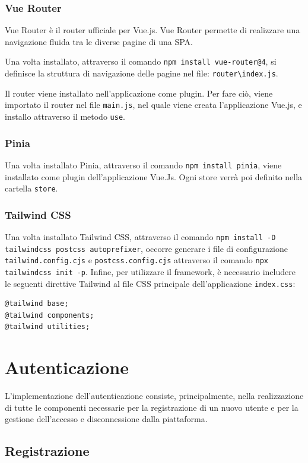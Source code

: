 \subsubsection{Vue Router}
Vue Router \`e il router ufficiale per Vue.js. Vue Router permette di realizzare una navigazione fluida tra le diverse pagine di una SPA.

Una volta installato, attraverso il comando \verb|npm install vue-router@4|, si definisce la struttura di navigazione delle pagine nel file: \verb|router\index.js|.

Il router viene installato nell'applicazione come plugin. Per fare ci\`o, viene importato il router nel file \verb|main.js|, nel quale viene creata l'applicazione Vue.js, e installo attraverso il metodo \verb|use|.
\subsubsection{Pinia}
Una volta installato Pinia, attraverso il comando \verb|npm install pinia|, viene installato come plugin dell'applicazione Vue.Js. Ogni store verr\`a poi definito nella cartella \verb|store|.

\subsubsection{Tailwind CSS}
Una volta installato Tailwind CSS, attraverso il comando \verb|npm install -D tailwindcss postcss autoprefixer|, occorre generare i file di configurazione \verb|tailwind.config.cjs| e \verb|postcss.config.cjs| attraverso il comando \verb|npx tailwindcss init -p|. Infine, per utilizzare il framework, \`e necessario includere le seguenti direttive Tailwind al file CSS principale dell'applicazione \verb|index.css|:
\begin{lstlisting}
@tailwind base;
@tailwind components;
@tailwind utilities;
\end{lstlisting}

\section{Autenticazione}
L'implementazione dell'autenticazione consiste, principalmente, nella realizzazione di tutte le componenti necessarie per la registrazione di un nuovo utente e per la gestione dell'accesso e disconnessione dalla piattaforma.
\subsection{Registrazione}
